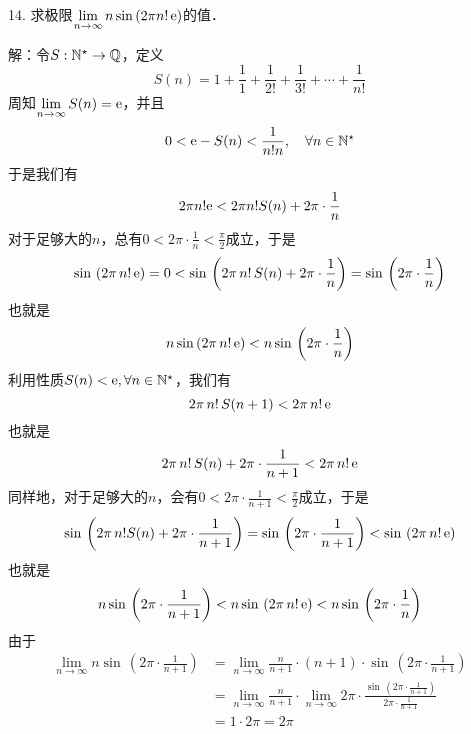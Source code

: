 14. 求极限$\displaystyle\lim_{n \to \infty} n \sin \, (2 \pi n! \, \mathrm{e})$的值．

解：令$S: \mathbb{N}^\star \to \mathbb{Q}$，定义
\begin{equation}
    S(n) = 1 + \frac{1}{1} + \frac{1}{2!} + \frac{1}{3!} + \cdots + \frac{1}{n!}
\end{equation}
周知$\displaystyle\lim_{n \to \infty} S(n) = \mathrm{e}$，并且
\begin{equation}
0 < \mathrm{e} - S(n) < \frac{1}{n! n}, \quad \forall n \in \mathbb{N}^\star
\end{equation}
于是我们有
\begin{equation}
2 \pi n! \mathrm{e} < 2 \pi n! S(n) + 2\pi \cdot \frac{1}{n}
\end{equation}
对于足够大的$n$，总有$0 < 2 \pi \cdot\displaystyle\frac{1}{n} < \displaystyle\frac{\pi}{2}$成立，于是
\begin{equation}
    \sin \, \left(2 \pi \, n! \, \mathrm{e} \right) = 0 < \sin \, \left(2 \pi \, n! \, S(n) + 2 \pi \cdot \displaystyle\frac{1}{n} \right) = \sin \, \left(2 \pi \cdot \displaystyle\frac{1}{n} \right)
\end{equation}
也就是
\begin{equation}
    n \sin \left(2 \pi \, n! \, \mathrm{e} \right) < n \sin \, \left(2 \pi \cdot \displaystyle\frac{1}{n} \right)
\end{equation}
利用性质$S(n) < \mathrm{e}, \forall n \in \mathbb{N}^\star$，我们有
\begin{equation}
    2 \pi \, n! \, S(n+1) < 2 \pi \, n! \, \mathrm{e}
\end{equation}
也就是
\begin{equation}
    2\pi \, n! \, S(n) + 2 \pi \cdot \displaystyle\frac{1}{n+1} < 2 \pi \, n! \, \mathrm{e}
\end{equation}
同样地，对于足够大的$n$，会有$0 < 2\pi \cdot \displaystyle\frac{1}{n+1} < \displaystyle\frac{\pi}{2}$成立，于是
\begin{equation}
    \sin \, \left(2 \pi \, n! S(n) + 2 \pi \cdot \displaystyle\frac{1}{n+1} \right) = \sin \, \left(2 \pi \cdot \displaystyle\frac{1}{n+1}\right) < \sin \, \left(2 \pi \, n! \, \mathrm{e} \right)
\end{equation}
也就是
\begin{equation}
    n \sin \, \left(2 \pi \cdot \displaystyle\frac{1}{n+1} \right) < n \sin \, \left(2 \pi \, n! \, \mathrm{e} \right) < n \sin \, \left(2 \pi \cdot \displaystyle\frac{1}{n}\right)
\end{equation}
由于
\begin{align}
    \lim_{n \to \infty} n \sin \, \left(2 \pi \cdot \displaystyle\frac{1}{n+1} \right) &= \lim_{n \to \infty} \displaystyle\frac{n}{n+1} \cdot (n+1) \cdot \sin \, \left(2 \pi \cdot \displaystyle\frac{1}{n+1}\right) \\
    &= \lim_{n \to \infty} \displaystyle\frac{n}{n+1} \cdot \lim_{n \to \infty} 2 \pi \cdot \displaystyle\frac{\sin \, \left(2 \pi \cdot \displaystyle\frac{1}{n+1}\right)}{2 \pi \cdot \displaystyle\frac{1}{n+1}} \\
    &= 1 \cdot 2 \pi = 2 \pi
\end{align}
